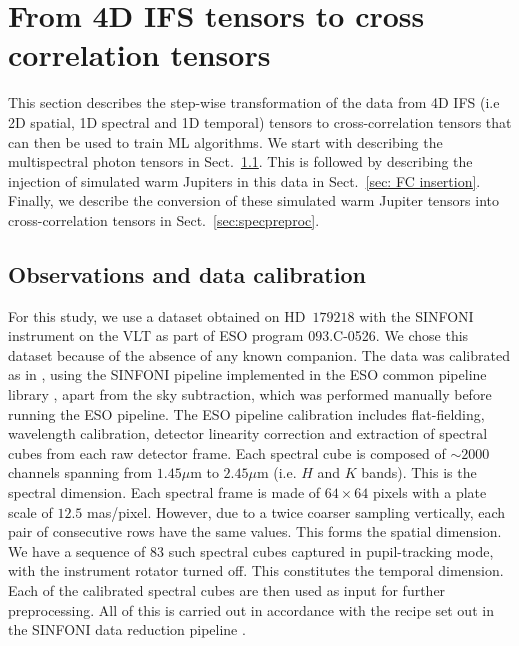 \documentclass{aa}
\begin{document}

\section{From 4D IFS tensors to cross correlation tensors}\label{sec:data}

This section describes the step-wise transformation of the data from 4D IFS (i.e 2D spatial, 1D spectral and 1D temporal) tensors to cross-correlation tensors that can then be used to train ML algorithms.
We start with describing the multispectral photon tensors in Sect.~\ref{sec:datadesc}.
This is followed by describing the injection of simulated warm Jupiters in this data in Sect.~\ref{sec: FC insertion}.
Finally, we describe the conversion of these simulated warm Jupiter tensors into cross-correlation tensors in Sect.~\ref{sec:specpreproc}.

\subsection{Observations and data calibration}\label{sec:datadesc}

For this study, we use a dataset obtained on HD~$179218$ with the SINFONI instrument on the VLT \citep{2004SINFONI,2003SEisenhauer} as part of ESO program 093.C-0526.
We chose this dataset because of the absence of any known companion.
The data was calibrated as in \citet{2018A&ChristiaensHD142527}, using the SINFONI pipeline implemented in the ESO common pipeline library \citep[EsoRex version 3.10.2;][]{2006Abuter}, apart from the sky subtraction, which was performed manually before running the ESO pipeline.
The ESO pipeline calibration includes flat-fielding, wavelength calibration, detector linearity correction and extraction of spectral cubes from each raw detector frame. 
Each spectral cube is composed of $\sim 2000$ channels spanning from $1.45\mu$m to $2.45 \mu$m (i.e. $H$ and $K$ bands).
This is the spectral dimension.
Each spectral frame is made of $64\times64$ pixels with a plate scale of $12.5$ mas/pixel. However, due to a twice coarser sampling vertically, each pair of consecutive rows have the same values.
This forms the spatial dimension.
We have a sequence of $83$ such spectral cubes captured in pupil-tracking mode, with the instrument rotator turned off.
This constitutes the temporal dimension.
Each of the calibrated spectral cubes are then used as input for further preprocessing.
All of this is carried out in accordance with the recipe set out in the SINFONI data reduction pipeline \citep{2006Abuter}.
\end{document}
